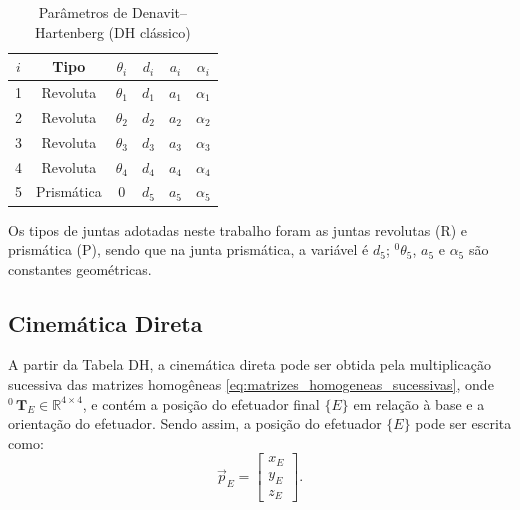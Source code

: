 \begin{table}[ht]
\centering
\caption{Parâmetros de Denavit--Hartenberg (DH clássico)}
\begin{tabular}{c c c c c c}
\hline
$i$ & Tipo & $\theta_i$ & $d_i$ & $a_i$ & $\alpha_i$ \\
\hline
1 & Revoluta & $\theta_1$ & $d_1$ & $a_1$ & $\alpha_1$ \\
2 & Revoluta & $\theta_2$ & $d_2$ & $a_2$ & $\alpha_2$ \\
3 & Revoluta & $\theta_3$ & $d_3$ & $a_3$ & $\alpha_3$ \\
4 & Revoluta & $\theta_4$ & $d_4$ & $a_4$ & $\alpha_4$ \\
5 & Prismática & $0$      & $d_5$ & $a_5$ & $\alpha_5$ \\
\hline
\end{tabular}
\label{tab:DH-MR}
\end{table}
Os tipos de juntas adotadas neste trabalho foram as juntas revolutas (R) e prismática (P), sendo que na junta prismática, a variável é $d_5$; ${}^0 \theta_5$, $a_5$ e $\alpha_5$ são constantes geométricas.

\subsection{Cinemática Direta}

A partir da Tabela DH, a cinemática direta pode ser obtida pela multiplicação sucessiva das matrizes homogêneas
\eqref{eq:matrizes_homogeneas_sucessivas},
onde ${}^0\,\mathbf{T}_{E} \in \mathbb{R}^{4 \times 4}$,
e contém a posição do efetuador final $\{E\}$ em relação à base e a orientação do efetuador.
Sendo assim, a posição do efetuador $\{E\}$ pode ser escrita como:
\begin{equation}
\vec{p}_E = 
\begin{bmatrix}
x_E \\ y_E \\ z_E
\end{bmatrix}.
\end{equation}

